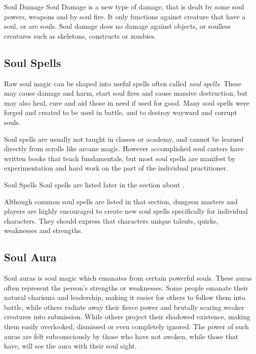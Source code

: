 \begin{35e}{Soul Damage}
  Soul Damage is a new type of damage, that is dealt by some soul powers,
  weapons and by soul fire. It only functions against creature that have a
  soul, or are souls. Soul damage does no damage against objects, or soulless
  creatures such as skeletons, constructs or zombies.
\end{35e}

\subsection{Soul Spells}
\label{sec:Soul Spells}

Raw soul magic can be shaped into useful spells often called \emph{soul spells}.
These may cause damage and harm, start soul fires and cause massive destruction,
but may also heal, cure and aid those in need if used for good. Many soul spells
were forged and created to be used in battle, and to destroy wayward and corrupt
souls.

Soul spells are usually not taught in classes or academy, and cannot be learned
directly from scrolls like arcane magic. However accomplished soul casters have
written books that teach fundamentals, but most soul spells are manifest by
experimentation and hard work on the part of the individual practitioner.

\begin{35e}{Soul Spells}
  Soul spells are listed later in the section about .

  Although common soul spells are listed in that section, dungeon masters and
  players are highly encouraged to create new soul spells specifically for
  individual characters. They should express that characters unique talents,
  quirks, weaknesses and strengths.
\end{35e}

\subsection{Soul Aura}
\label{sec:Soul Aura}

Soul auras is soul magic which emanates from certain powerful souls. These
auras often represent the person's strengths or weaknesses. Some people
emanate their natural charisma and leadership, making it easier for others to
follow them into battle, while others radiate away their fierce power and
brutally scaring weaker creatures into submission. While others project their
shadowed existence, making them easily overlooked, dismissed or even
completely ignored. The power of such auras are felt subconsciously by those
who have not awoken, while those that have, will see the aura with their soul
sight.

